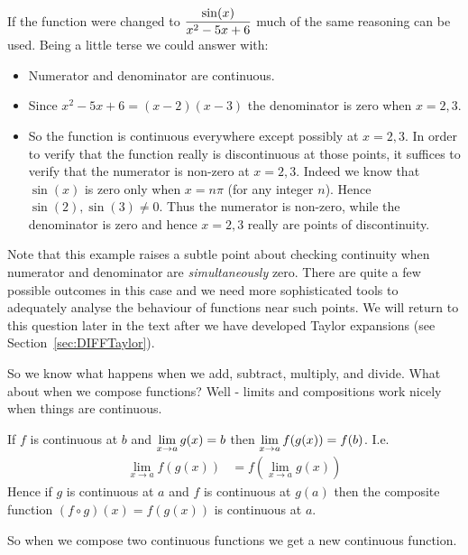 \begin{eg}
If the function were changed to $\displaystyle \frac{\sin(x)}{x^2-5x+6}$ much of the same
reasoning can be used. Being a little terse we could answer with:
  \begin{itemize}
   \item Numerator and denominator are continuous.
   \item Since $x^2-5x+6=(x-2)(x-3)$ the denominator is zero when $x=2,3$.
   \item So the function is continuous everywhere except possibly
at $x=2,3$. In order to verify that the function really is discontinuous at
those points, it suffices to verify that the numerator is non-zero at $x=2,3$.
Indeed we know that $\sin(x)$ is zero only when $x = n\pi$ (for any integer
$n$). Hence $\sin(2),\sin(3) \neq 0$. Thus the numerator is non-zero, while the
denominator is zero and hence $x=2,3$ really are points of discontinuity.
\end{itemize}
Note that this example raises a subtle point about checking continuity when
numerator and denominator are \emph{simultaneously} zero. There are quite a
few possible outcomes in this case and we need more sophisticated tools to
adequately analyse the behaviour of functions near such points. We will return
to this question later in the text after we have developed Taylor expansions (see
Section~\ref{sec:DIFFTaylor}).
\end{eg}

So we know what happens when we add, subtract, multiply, and divide. What about
when we compose functions? Well - limits and compositions work nicely when
things are continuous.
\begin{theorem}\label{thm comp cont}
  If $f$ is continuous at $b$ and $\displaystyle \lim_{x \to a} g(x) = b$ then
$\displaystyle \lim_{x\to a} f(g(x)) = f(b)$. I.e.
  \begin{align*}
   \lim_{x \to a} f\left( g(x) \right) &= f\left( \lim_{x \to a} g(x) \right)
  \end{align*}
Hence if $g$ is continuous at $a$ and $f$ is continuous at $g(a)$ then the
composite function $(f \circ g)(x) = f(g(x))$ is continuous at $a$.
\end{theorem}
So when we compose two continuous functions we get a new continuous function.

